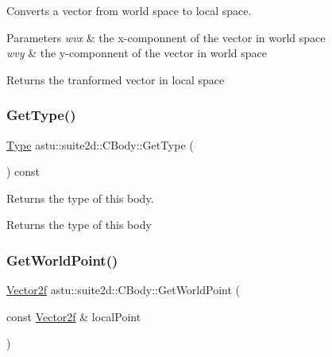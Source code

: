 Converts a vector from world space to local space.


\begin{DoxyParams}{Parameters}
{\em wvx} & the x-\/componnent of the vector in world space \\
\hline
{\em wvy} & the y-\/componnent of the vector in world space \\
\hline
\end{DoxyParams}
\begin{DoxyReturn}{Returns}
the tranformed vector in local space 
\end{DoxyReturn}
\mbox{\label{classastu_1_1suite2d_1_1CBody_a78f429bf50e5ece567478212cad5e652}} 
\subsubsection{\texorpdfstring{Get\+Type()}{GetType()}}
{\footnotesize\ttfamily \hyperlink{classastu_1_1suite2d_1_1CBody_a5731a8b9f24de5494683e4b7e8016b64}{Type} astu\+::suite2d\+::\+C\+Body\+::\+Get\+Type (\begin{DoxyParamCaption}{ }\end{DoxyParamCaption}) const\hspace{0.3cm}{\ttfamily [inline]}}

Returns the type of this body.

\begin{DoxyReturn}{Returns}
the type of this body 
\end{DoxyReturn}
\mbox{\label{classastu_1_1suite2d_1_1CBody_a05b6ac1a2b425cf4dad2924204707029}} 
\subsubsection{\texorpdfstring{Get\+World\+Point()}{GetWorldPoint()}\hspace{0.1cm}{\footnotesize\ttfamily [1/2]}}
{\footnotesize\ttfamily \hyperlink{classastu_1_1Vector2}{Vector2f} astu\+::suite2d\+::\+C\+Body\+::\+Get\+World\+Point (\begin{DoxyParamCaption}\item[{const \hyperlink{classastu_1_1Vector2}{Vector2f} \&}]{local\+Point }\end{DoxyParamCaption})\hspace{0.3cm}{\ttfamily [inline]}}

